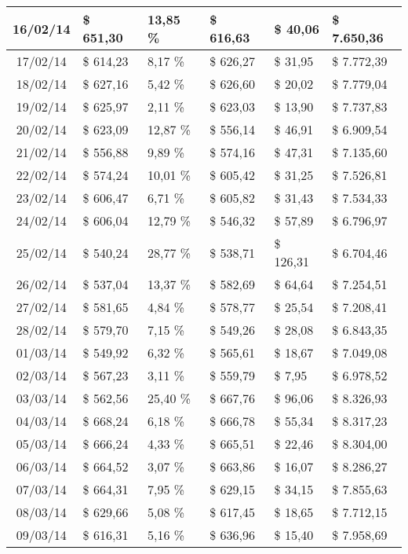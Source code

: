 \begin{small}
\begin{longtable}{|c|l|l|l|l|l|}
16/02/14 & \$ 651,30 & 13,85 \% & \$ 616,63 & \$ 40,06 & \$ 7.650,36 \\ \hline
17/02/14 & \$ 614,23 & 8,17 \% & \$ 626,27 & \$ 31,95 & \$ 7.772,39 \\ \hline
18/02/14 & \$ 627,16 & 5,42 \% & \$ 626,60 & \$ 20,02 & \$ 7.779,04 \\ \hline
19/02/14 & \$ 625,97 & 2,11 \% & \$ 623,03 & \$ 13,90 & \$ 7.737,83 \\ \hline
20/02/14 & \$ 623,09 & 12,87 \% & \$ 556,14 & \$ 46,91 & \$ 6.909,54 \\ \hline
21/02/14 & \$ 556,88 & 9,89 \% & \$ 574,16 & \$ 47,31 & \$ 7.135,60 \\ \hline
22/02/14 & \$ 574,24 & 10,01 \% & \$ 605,42 & \$ 31,25 & \$ 7.526,81 \\ \hline
23/02/14 & \$ 606,47 & 6,71 \% & \$ 605,82 & \$ 31,43 & \$ 7.534,33 \\ \hline
24/02/14 & \$ 606,04 & 12,79 \% & \$ 546,32 & \$ 57,89 & \$ 6.796,97 \\ \hline
25/02/14 & \$ 540,24 & 28,77 \% & \$ 538,71 & \$ 126,31 & \$ 6.704,46 \\ \hline
26/02/14 & \$ 537,04 & 13,37 \% & \$ 582,69 & \$ 64,64 & \$ 7.254,51 \\ \hline
27/02/14 & \$ 581,65 & 4,84 \% & \$ 578,77 & \$ 25,54 & \$ 7.208,41 \\ \hline
28/02/14 & \$ 579,70 & 7,15 \% & \$ 549,26 & \$ 28,08 & \$ 6.843,35 \\ \hline
01/03/14 & \$ 549,92 & 6,32 \% & \$ 565,61 & \$ 18,67 & \$ 7.049,08 \\ \hline
02/03/14 & \$ 567,23 & 3,11 \% & \$ 559,79 & \$ 7,95 & \$ 6.978,52 \\ \hline
03/03/14 & \$ 562,56 & 25,40 \% & \$ 667,76 & \$ 96,06 & \$ 8.326,93 \\ \hline
04/03/14 & \$ 668,24 & 6,18 \% & \$ 666,78 & \$ 55,34 & \$ 8.317,23 \\ \hline
05/03/14 & \$ 666,24 & 4,33 \% & \$ 665,51 & \$ 22,46 & \$ 8.304,00 \\ \hline
06/03/14 & \$ 664,52 & 3,07 \% & \$ 663,86 & \$ 16,07 & \$ 8.286,27 \\ \hline
07/03/14 & \$ 664,31 & 7,95 \% & \$ 629,15 & \$ 34,15 & \$ 7.855,63 \\ \hline
08/03/14 & \$ 629,66 & 5,08 \% & \$ 617,45 & \$ 18,65 & \$ 7.712,15 \\ \hline
09/03/14 & \$ 616,31 & 5,16 \% & \$ 636,96 & \$ 15,40 & \$ 7.958,69 \\ \hline

\end{longtable}
\end{small}
